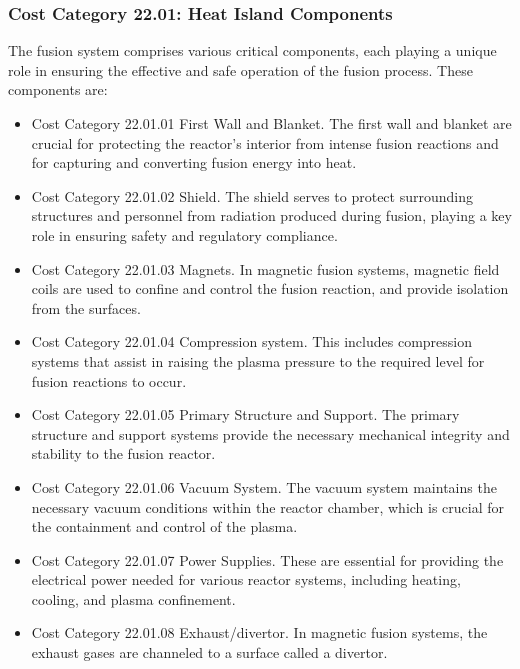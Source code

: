 \subsubsection{Cost Category 22.01: Heat Island Components}

The fusion system comprises various critical components, each playing a unique role in ensuring the effective and safe operation of the fusion process. These components are:

\begin{itemize}
    \item Cost Category 22.01.01 First Wall and Blanket. The first wall and blanket are crucial for protecting the reactor's interior from intense fusion reactions and for capturing and converting fusion energy into heat.
    
    \item Cost Category 22.01.02 Shield. The shield serves to protect surrounding structures and personnel from radiation produced during fusion, playing a key role in ensuring safety and regulatory compliance.
    
    \item Cost Category 22.01.03 Magnets. In magnetic fusion systems, magnetic field coils are used to confine and control the fusion reaction, and provide isolation from the surfaces.
    
    \item Cost Category 22.01.04 Compression system. This includes compression systems that assist in raising the plasma pressure to the required level for fusion reactions to occur.  
    
    \item Cost Category 22.01.05 Primary Structure and Support. The primary structure and support systems provide the necessary mechanical integrity and stability to the fusion reactor.
    
    \item Cost Category 22.01.06 Vacuum System. The vacuum system maintains the necessary vacuum conditions within the reactor chamber, which is crucial for the containment and control of the plasma.
    
    \item Cost Category 22.01.07 Power Supplies. These are essential for providing the electrical power needed for various reactor systems, including heating, cooling, and plasma confinement.
    
    \item Cost Category 22.01.08 Exhaust/divertor. In magnetic fusion systems, the exhaust gases are channeled to a surface called a divertor.


\end{itemize}
